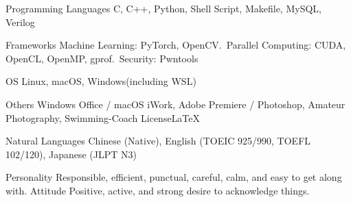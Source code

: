 

\begin{cvskills}

  \cvskill
    {Programming Languages} %
    {C, C++, Python, Shell Script, Makefile, MySQL, Verilog} %

  \cvskill
    {Frameworks} %
    {Machine Learning: PyTorch, OpenCV.\ Parallel Computing: CUDA, OpenCL, OpenMP, gprof.\ Security: Pwntools} %

  \cvskill
    {OS} %
    {Linux, macOS, Windows(including WSL)} %

  \cvskill
    {Others} %
    {Windows Office / macOS iWork, Adobe Premiere / Photoshop, Amateur Photography, Swimming-Coach License\LaTeX} %

  \cvskill
    {Natural Languages} %
    {Chinese (Native), English (TOEIC 925/990, TOEFL 102/120), Japanese (JLPT N3)} %

\end{cvskills}


\begin{cvskills}
    \cvskill
        {Personality}
        {Responsible, efficient, punctual, careful, calm, and easy to get along with.}
    \cvskill
        {Attitude}
        {Positive, active, and strong desire to acknowledge things.}
\end{cvskills}